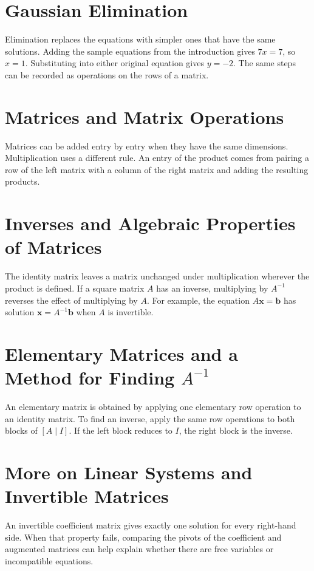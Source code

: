 \documentclass[11pt,letterpaper,oneside,openany]{textbookchapter}
\begin{document}
\section{Gaussian Elimination}
Elimination replaces the equations with simpler ones that have the same
solutions. Adding the sample equations from the introduction gives \(7x=7\),
so \(x=1\). Substituting into either original equation gives \(y=-2\). The
same steps can be recorded as operations on the rows of a matrix.

\section{Matrices and Matrix Operations}
Matrices can be added entry by entry when they have the same dimensions.
Multiplication uses a different rule. An entry of the product comes from
pairing a row of the left matrix with a column of the right matrix and adding
the resulting products.

\section{Inverses and Algebraic Properties of Matrices}
The identity matrix leaves a matrix unchanged under multiplication wherever
the product is defined. If a square matrix \(A\) has an inverse, multiplying
by \(A^{-1}\) reverses the effect of multiplying by \(A\). For example, the
equation \(A\mathbf{x}=\mathbf{b}\) has solution
\(\mathbf{x}=A^{-1}\mathbf{b}\) when \(A\) is invertible.

\section{Elementary Matrices and a Method for Finding
  \texorpdfstring{\textcolor{ChapterAccent}{\(A^{-1}\)}}{A inverse}}
An elementary matrix is obtained by applying one elementary row operation to
an identity matrix. To find an inverse, apply the same row operations to both
blocks of \([A\mid I]\). If the left block reduces to \(I\), the right
block is the inverse.

\section{More on Linear Systems and Invertible Matrices}
An invertible coefficient matrix gives exactly one solution for every
right-hand side. When that property fails, comparing the pivots of the
coefficient and augmented matrices can help explain whether there are free
variables or incompatible equations.
\end{document}
